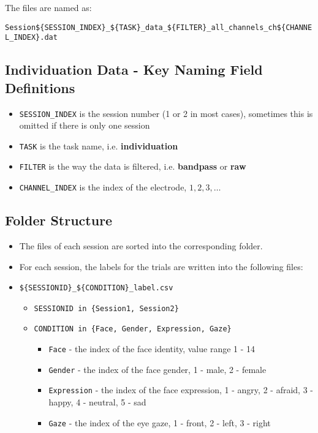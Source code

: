 \documentclass[11pt]{article}
\begin{document}
The files are named as:

\texttt{Session\$\{SESSION\_INDEX\}\_\$\{TASK\}\_data\_\$\{FILTER\}\_all\_channels\_ch\$\{CHANNEL\_INDEX\}.dat}

\subsection{Individuation Data - Key Naming Field Definitions}
\label{sec:org04bda2f}

\begin{itemize}
\item \texttt{SESSION\_INDEX} is the session number (1 or 2 in most cases), sometimes this is omitted if there is only one session
\item \texttt{TASK} is the task name, i.e. \textbf{individuation}
\item \texttt{FILTER} is the way the data is filtered, i.e. \textbf{bandpass} or \textbf{raw}
\item \texttt{CHANNEL\_INDEX} is the index of the electrode, \(1, 2, 3, \ldots\)
\end{itemize}

\subsection{Folder Structure}
\label{sec:orgf55c1e9}

\begin{itemize}
\item The files of each session are sorted into the corresponding folder. 
\item For each session, the labels for the trials are written into the following files:
\item \texttt{\$\{SESSIONID\}\_\$\{CONDITION\}\_label.csv}
\begin{itemize}
\item \texttt{SESSIONID in \{Session1, Session2\}}
\item \texttt{CONDITION in \{Face, Gender, Expression, Gaze\}}
\begin{itemize}
\item \texttt{Face} - the index of the face identity, value range 1 - 14
\item \texttt{Gender} - the index of the face gender, 1 - male, 2 - female
\item \texttt{Expression} - the index of the face expression, 1 - angry, 2 - afraid, 3 - happy, 4 - neutral, 5 - sad
\item \texttt{Gaze} - the index of the eye gaze, 1 - front, 2 - left, 3 - right
\end{itemize}
\end{itemize}
\end{itemize}
\end{document}
